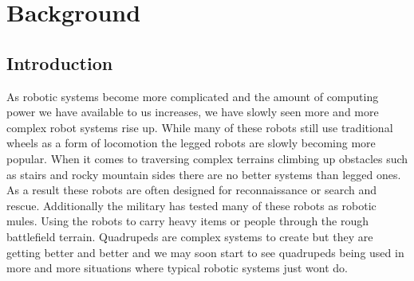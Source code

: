 \graphicspath{ {./figures/} }
\section{Background}
\label{chap:background}
\subsection{Introduction}
    As robotic systems become more complicated and the amount of computing power we have available to us increases, we have slowly seen more and more complex robot systems rise up. While many of these robots still use traditional wheels as a form of locomotion the legged robots are slowly becoming more popular. When it comes to traversing complex terrains climbing up obstacles such as stairs and rocky mountain sides there are no better systems than legged ones. As a result these robots are often designed for reconnaissance or search and rescue. Additionally the military has tested many of these robots as robotic mules. Using the robots to  carry heavy items or people through the rough battlefield terrain. Quadrupeds are complex systems to create but they are getting better and better and we may soon start to see quadrupeds being used in more and more situations where typical robotic systems just wont do.
